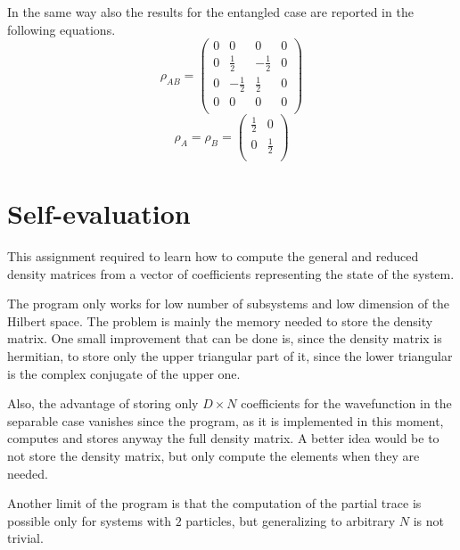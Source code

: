 \documentclass[11pt,a4paper]{article}
\begin{document}
In the same way also the results for the entangled case are reported in the following equations.
\begin{equation}
\rho_{AB} =
\begin{pmatrix}
	0 & 0 & 0 & 0\\
	0 &  \frac{1}{2} & -\frac{1}{2} & 0\\
	0 & -\frac{1}{2} &  \frac{1}{2} & 0\\
	0 & 0 & 0 & 0\\
\end{pmatrix}
\label{eq:DMatEnt}
\end{equation}
\begin{equation}
\rho_{A} = \rho_{B} = 
\begin{pmatrix}
	\frac{1}{2} & 0\\
	0 & \frac{1}{2}\\
\end{pmatrix}
\label{eq:RedMatEnt}
\end{equation}


\section{Self-evaluation} %

This assignment required to learn how to compute the general and reduced density matrices from a vector of coefficients representing the state of the system.

The program only works for low number of subsystems and low dimension of the Hilbert space. The problem is mainly the memory needed to store the density matrix. 
One small improvement that can be done is, since the density matrix is hermitian, to store only the upper triangular part of it, since the lower triangular is the complex conjugate of the upper one.

Also, the advantage of storing only $D\times N$ coefficients for the wavefunction in the separable case vanishes since the program, as it is implemented in this moment, computes and stores anyway the full density matrix.
A better idea would be to not store the density matrix, but only compute the elements when they are needed.

Another limit of the program is that the computation of the partial trace is possible only for systems with $2$ particles, but generalizing to arbitrary $N$ is not trivial.
	
\end{document}
